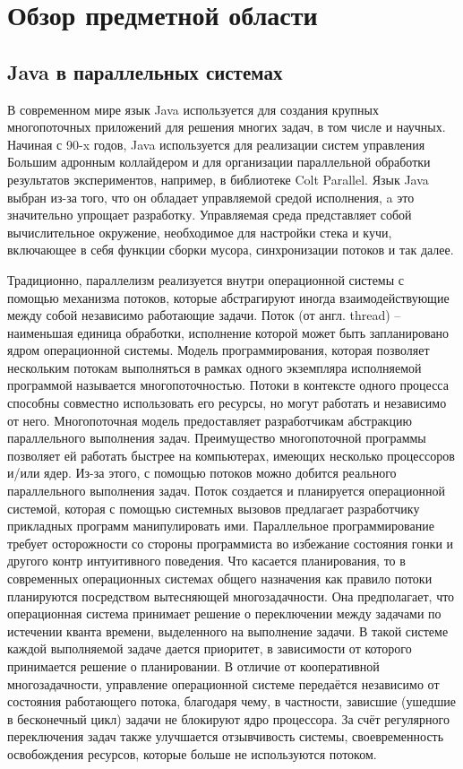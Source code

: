 \section{Обзор предметной области}
	\subsection{Java в параллельных системах}
	В современном мире язык Java используется для создания крупных многопоточных приложений 
	для решения многих задач, в том числе и научных. Начиная с 90-x годов, Java используется для реализации
	систем управления Большим адронным коллайдером и для организации параллельной обработки результатов 
	экспериментов, например, в библиотеке Colt Parallel\cite{colt}. Язык Java выбран из-за того, что он 
	обладает управляемой средой исполнения, a это значительно упрощает разработку. Управляемая среда представляет
	собой вычислительное окружение, необходимое для настройки стека и кучи, включающее в себя функции сборки мусора,
	синхронизации потоков и так далее.
	\par
	Традиционно, параллелизм реализуется внутри операционной системы с помощью механизма потоков, 
	которые абстрагируют иногда взаимодействующие между собой независимо работающие задачи. 
	Поток (от англ. thread) -- наименьшая единица обработки, исполнение которой может 
	быть запланировано ядром операционной системы\cite{thread}. 
	Модель программирования, которая позволяет нескольким потокам выполняться в рамках одного экземпляра
	исполняемой программой называется многопоточностью. Потоки в контексте одного процесса способны совместно
	использовать его ресурсы, но могут работать и независимо от него. Многопоточная модель предоставляет
	разработчикам абстракцию параллельного выполнения задач. Преимущество многопоточной программы 
	позволяет ей работать быстрее на компьютерах, имеющих несколько процессоров и/или ядер. Из-за этого, с
	помощью потоков можно добится реального параллельного выполнения задач. Поток создается и планируется
	операционной системой, которая с помощью системных вызовов предлагает разработчику прикладных программ
	манипулировать ими. Параллельное программирование требует осторожности со стороны программиста во избежание
	состояния гонки и другого контр интуитивного поведения. 
	Что касается планирования, то в современных операционных системах общего назначения как правило потоки
	планируются посредством вытесняющей многозадачности. Она предполагает, что операционная система принимает
	решение о переключении между задачами по истечении кванта времени, выделенного на выполнение задачи.
	В такой системе каждой выполняемой задаче дается приоритет, в зависимости от которого принимается решение
	о планировании. В отличие от кооперативной многозадачности, управление операционной системе передаётся
	независимо от состояния работающего потока, благодаря чему, в частности, зависшие (ушедшие в бесконечный цикл)
	задачи не блокируют ядро процессора. За счёт регулярного переключения задач 
	также улучшается отзывчивость системы, своевременность освобождения ресурсов, которые больше
	не используются потоком.
	
